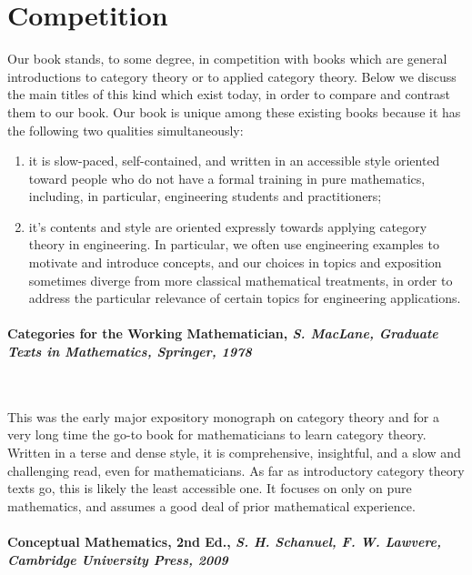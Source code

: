 \documentclass[10pt, article, one side]{memoir}
\begin{document}
    \section{Competition}
    \label{sec:competition}


    Our book stands, to some degree, in competition with books which are general introductions to category theory or to applied category theory. Below we discuss the main titles of this kind which exist today, in order to compare and contrast them to our book.
    Our book is unique among these existing books because it has the following two qualities simultaneously:
    \begin{enumerate}
        \item it is slow-paced, self-contained, and written in an accessible style oriented toward people who do not have a formal training in pure mathematics, including, in particular, engineering students and practitioners;
        \item it's contents and style are oriented expressly towards applying category theory in engineering. In particular, we often use engineering examples to motivate and introduce concepts, and our choices in topics and exposition sometimes diverge from more classical mathematical treatments, in order to address the particular relevance of certain topics for engineering applications. 
    \end{enumerate}

    \paragraph{Categories for the Working Mathematician, \emph{S.
            MacLane, Graduate Texts in Mathematics, Springer, 1978}} 
            \
            
            This was the early major expository monograph on category theory and for a very long time the go-to book for mathematicians to learn category theory.
    Written in a terse and dense style, it is comprehensive, insightful, and a slow and challenging read, even for mathematicians.
    As far as introductory category theory texts go, this is likely the least accessible one.
    It focuses on only on pure mathematics, and assumes a good deal of prior mathematical experience.


    \paragraph{Conceptual Mathematics, 2nd Ed., \emph{S.
            H.
            Schanuel, F.
            W.
            Lawvere, Cambridge University Press, 2009}} 
            \
\end{document}
